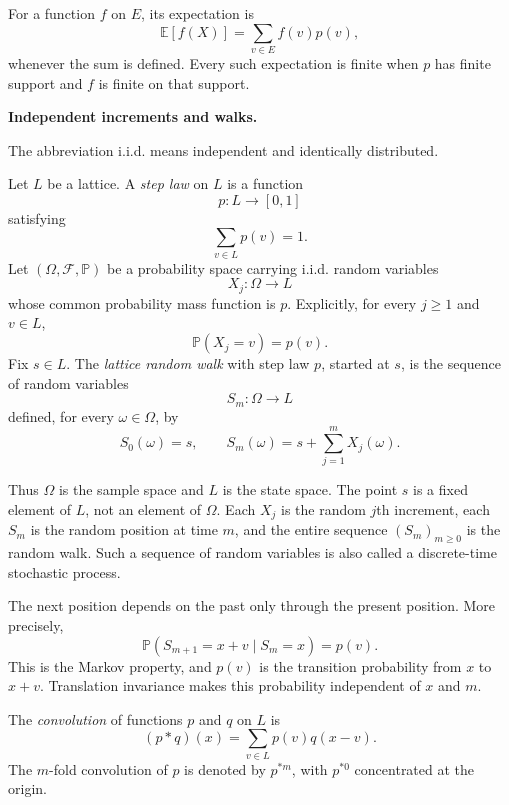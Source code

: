 For a function $f$ on $E$, its expectation
is
$$
\mathbb E[f(X)]
=\sum_{v\in E}f(v)p(v),
$$
whenever the sum is defined. Every such
expectation is finite when $p$ has finite
support and $f$ is finite on that support.

\medskip\noindent
{\bf Independent increments and walks.}


The abbreviation i.i.d. means independent
and identically distributed.

\begin{definition}
\label{definition-lattice-random-walk}
Let $L$ be a lattice. A \emph{step law}
on $L$ is a function
$$
p:L\longrightarrow[0,1]
$$
satisfying
$$
\sum_{v\in L}p(v)=1.
$$
Let $(\Omega,\mathcal F,\mathbb P)$ be a
probability space carrying i.i.d. random
variables
$$
X_j:\Omega\longrightarrow L
$$
whose common probability mass function is
$p$. Explicitly, for every $j\geq 1$ and
$v\in L$,
$$
\mathbb P(X_j=v)=p(v).
$$
Fix $s\in L$. The \emph{lattice random
walk} with step law $p$, started at $s$,
is the sequence of random variables
$$
S_m:\Omega\longrightarrow L
$$
defined, for every $\omega\in\Omega$, by
$$
S_0(\omega)=s,
\qquad
S_m(\omega)
=s+\sum_{j=1}^mX_j(\omega).
$$
\end{definition}

Thus $\Omega$ is the sample space and $L$
is the state space. The point $s$ is a
fixed element of $L$, not an element of
$\Omega$. Each $X_j$ is the random
$j$th increment, each $S_m$ is the random
position at time $m$, and the entire
sequence $(S_m)_{m\geq 0}$ is the random
walk. Such a sequence of random variables
is also called a discrete-time stochastic
process.

The next position depends on the past only
through the present position. More
precisely,
$$
\mathbb P(S_{m+1}=x+v\mid S_m=x)=p(v).
$$
This is the Markov property, and $p(v)$ is
the transition probability from $x$ to
$x+v$. Translation invariance makes this
probability independent of $x$ and $m$.

\begin{definition}
\label{definition-convolution-discrete-laws}
The \emph{convolution} of functions $p$
and $q$ on $L$ is
$$
(p*q)(x)=\sum_{v\in L}p(v)q(x-v).
$$
The $m$-fold convolution of $p$ is denoted
by $p^{*m}$, with $p^{*0}$ concentrated at
the origin.
\end{definition}

